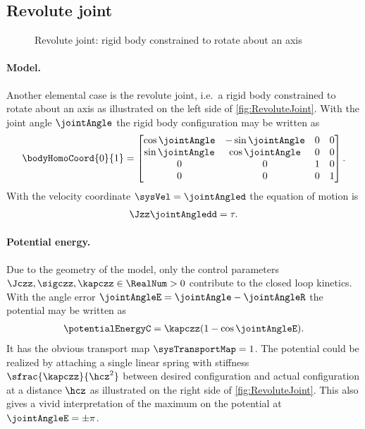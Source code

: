 \subsection{Revolute joint}\label{sec:CtrlExampleRevoluteJoint}
\begin{figure}[h!]
 \centering
 
 \caption{Revolute joint: rigid body constrained to rotate about an axis}
 \label{fig:RevoluteJoint}
\end{figure}

\paragraph{Model.}
Another elemental case is the revolute joint, i.e.\ a rigid body constrained to rotate about an axis as illustrated on the left side of \autoref{fig:RevoluteJoint}.
With the joint angle $\jointAngle$ the rigid body configuration may be written as
\begin{align}
 \bodyHomoCoord{0}{1} = \begin{bmatrix} \cos\jointAngle & -\sin\jointAngle & 0 & 0 \\ \sin\jointAngle & \cos\jointAngle & 0 & 0 \\ 0 & 0 & 1 & 0 \\ 0 & 0 & 0 & 1\end{bmatrix}.
\end{align}
With the velocity coordinate $\sysVel = \jointAngled$ the equation of motion is
\begin{align}\label{eq:RevoluteJointModel}
 \Jzz \jointAngledd = \tau.
\end{align}

\paragraph{Potential energy.}
Due to the geometry of the model, only the control parameters $\Jczz, \sigczz, \kapczz \in \RealNum > 0$ contribute to the closed loop kinetics.
With the angle error $\jointAngleE = \jointAngle - \jointAngleR$ the potential may be written as
\begin{align}
 \potentialEnergyC = \kapczz (1 - \cos\jointAngleE).
\end{align}
It has the obvious transport map $\sysTransportMap = 1$.
The potential could be realized by attaching a single linear spring with stiffness $\sfrac{\kapczz}{\hcz^2}$ between desired configuration and actual configuration at a distance $\hcz$ as illustrated on the right side of \autoref{fig:RevoluteJoint}.
This also gives a vivid interpretation of the maximum on the potential at $\jointAngleE = \pm\pi$.

